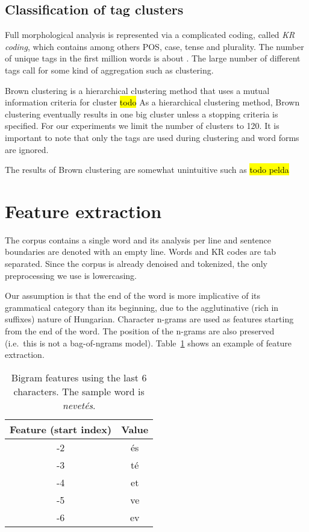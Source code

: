\documentclass{article}
\begin{document}
\subsection{Classification of tag clusters}

Full morphological analysis is represented via a complicated coding, called \emph{KR coding}, which contains among others POS, case, tense and plurality.
The number of unique tags in the first million words is about .
The large number of different tags call for some kind of aggregation such as clustering.

Brown clustering is a hierarchical clustering method that uses a mutual information criteria for cluster \hl{todo}
As a hierarchical clustering method, Brown clustering eventually results in one big cluster unless a stopping criteria is specified.
For our experiments we limit the number of clusters to 120.
It is important to note that only the tags are used during clustering and word forms are ignored.

The results of Brown clustering are somewhat unintuitive such as \hl{todo pelda}

\section{Feature extraction}

The corpus contains a single word and its analysis per line and sentence boundaries are denoted with an empty line.
Words and KR codes are tab separated.
Since the corpus is already denoised and tokenized, the only preprocessing we use is lowercasing.

Our assumption is that the end of the word is more implicative of its grammatical category than its beginning, due to the agglutinative (rich in suffixes) nature of Hungarian.
Character n-grams are used as features starting from the end of the word.
The position of the n-grams are also preserved (i.e.~this is not a bag-of-ngrams model).
Table~\ref{table:feat_extract} shows an example of feature extraction.


\begin{table}[t]
    \caption{Bigram features using the last 6 characters. The sample word is \emph{nevetés}.}
  \label{table:feat_extract}
  \centering
  \begin{tabular}{cc}
      \toprule
      Feature (start index) & Value \\
      \midrule
      -2 & és \\
      -3 & té \\
      -4 & et \\
      -5 & ve \\
      -6 & ev \\
      \bottomrule
  \end{tabular}
\end{table}
\end{document}
